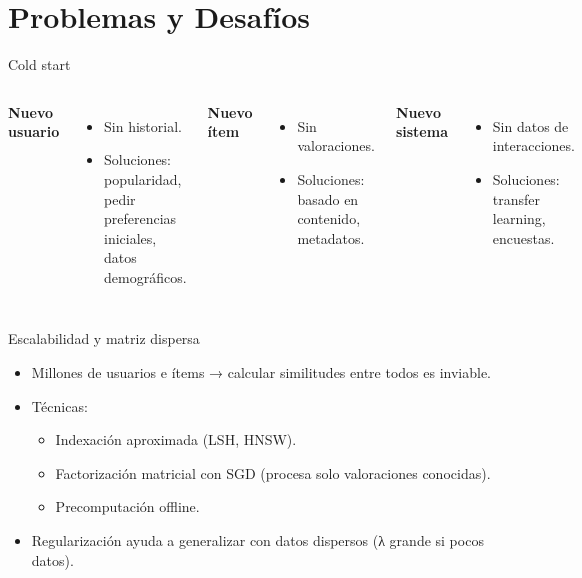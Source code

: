 \documentclass[aspectratio=169, 10pt, xcolor=table]{beamer}
\begin{document}
\section{Problemas y Desafíos}

\begin{frame}{Cold start}
    \begin{columns}[t]
        \textbf{Nuevo usuario}
        \begin{itemize}
            \item Sin historial.
            \item Soluciones: popularidad, pedir preferencias iniciales, datos demográficos.
        \end{itemize}
        \textbf{Nuevo ítem}
        \begin{itemize}
            \item Sin valoraciones.
            \item Soluciones: basado en contenido, metadatos.
        \end{itemize}
        \textbf{Nuevo sistema}
        \begin{itemize}
            \item Sin datos de interacciones.
            \item Soluciones: transfer learning, encuestas.
        \end{itemize}
    \end{columns}
\end{frame}

\begin{frame}{Escalabilidad y matriz dispersa}
    \begin{itemize}
        \item Millones de usuarios e ítems → calcular similitudes entre todos es inviable.
        \item Técnicas:
        \begin{itemize}
            \item Indexación aproximada (LSH, HNSW).
            \item Factorización matricial con SGD (procesa solo valoraciones conocidas).
            \item Precomputación offline.
        \end{itemize}
        \item Regularización ayuda a generalizar con datos dispersos (λ grande si pocos datos).
    \end{itemize}
\end{frame}
\end{document}
